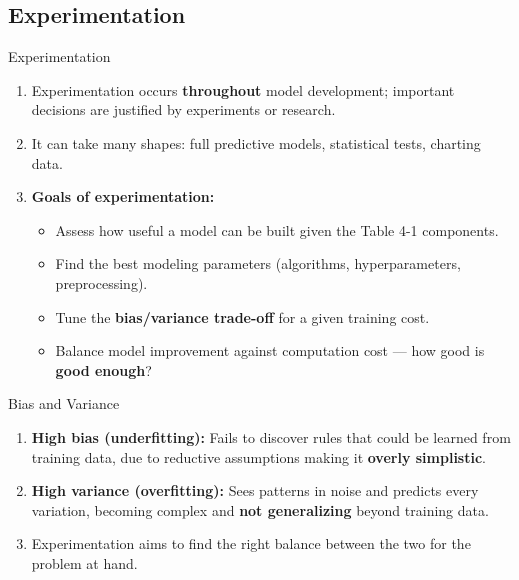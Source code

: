 \subsection{Experimentation}

\begin{frame}{Experimentation}
\begin{enumerate}
\item<1-> Experimentation occurs \textbf{throughout} model development; important decisions are justified by experiments or research.
\item<2-> It can take many shapes: full predictive models, statistical tests, charting data.
\item<3-> \textbf{Goals of experimentation:}
    \begin{itemize}
    \item Assess how useful a model can be built given the Table 4-1 components.
    \item Find the best modeling parameters (algorithms, hyperparameters, preprocessing).
    \item Tune the \textbf{bias/variance trade-off} for a given training cost.
    \item Balance model improvement against computation cost --- how good is \textbf{good enough}?
    \end{itemize}
\end{enumerate}
\end{frame}

\begin{frame}{Bias and Variance}
\begin{enumerate}
\item<1-> \textbf{High bias (underfitting):} Fails to discover rules that could be learned from training data, due to reductive assumptions making it \textbf{overly simplistic}.
\item<2-> \textbf{High variance (overfitting):} Sees patterns in noise and predicts every variation, becoming complex and \textbf{not generalizing} beyond training data.
\item<3-> Experimentation aims to find the right balance between the two for the problem at hand.
\end{enumerate}
\end{frame}

